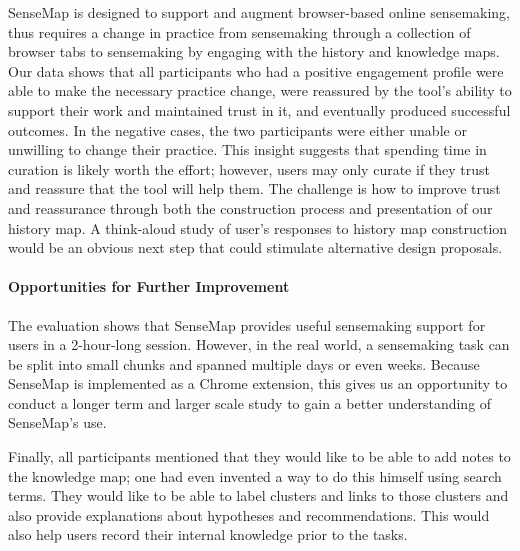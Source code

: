 SenseMap is designed to support and augment browser-based online sensemaking, thus requires a change in practice from sensemaking through a collection of browser tabs to sensemaking by engaging with the history and knowledge maps. Our data shows that all participants who had a positive engagement profile were able to make the necessary practice change, were reassured by the tool's ability to support their work and maintained trust in it, and eventually produced successful outcomes. In the negative cases, the two participants were either unable or unwilling to change their practice. This insight suggests that spending time in curation is likely worth the effort; however, users may only curate if they trust and reassure that the tool will help them. The challenge is how to improve trust and reassurance through both the construction process and presentation of our history map. A think-aloud study of user's responses to history map construction would be an obvious next step that could stimulate alternative design proposals.

\paragraph{Opportunities for Further Improvement}
The evaluation shows that SenseMap provides useful sensemaking support for users in a 2-hour-long session. However, in the real world, a sensemaking task can be split  into small chunks and spanned multiple days or even weeks. Because SenseMap is implemented as a Chrome extension, this gives us an opportunity to conduct a longer term and larger scale study to gain a better understanding of SenseMap's use.

Finally, all participants mentioned that they would like to be able to add notes to the knowledge map; one had even invented a way to do this himself using search terms. They would like to be able to label clusters and links to those clusters and also provide explanations about hypotheses and recommendations. This would also help users record their internal knowledge prior to the tasks.